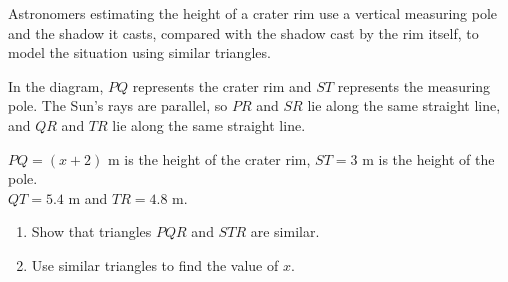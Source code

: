 \begin{question}
\noindent Astronomers estimating the height of a crater rim use a vertical measuring pole and the shadow it casts, compared with the shadow cast by the rim itself, to model the situation using similar triangles.

\noindent In the diagram, $PQ$ represents the crater rim and $ST$ represents the measuring pole. The Sun's rays are parallel, so $PR$ and $SR$ lie along the same straight line, and $QR$ and $TR$ lie along the same straight line.

\begin{center}
\end{center}

\noindent $PQ = (x+2)$ m is the height of the crater rim, $ST = 3$ m is the height of the pole.\\
$QT = 5.4$ m and $TR = 4.8$ m.

\begin{enumerate}
    \item[(a)] Show that triangles $PQR$ and $STR$ are similar.

    \vspace{3.5cm}

    \item[(b)] Use similar triangles to find the value of $x$.

    \vspace{4cm}
\end{enumerate}
\end{question}
